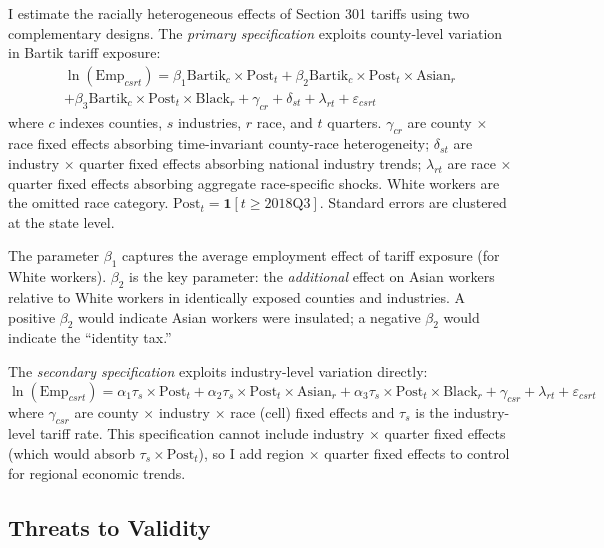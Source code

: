 \documentclass[12pt]{article}
\begin{document}
I estimate the racially heterogeneous effects of Section 301 tariffs using two complementary designs. The \textit{primary specification} exploits county-level variation in Bartik tariff exposure:
\begin{multline}\label{eq:main}
\ln(\text{Emp}_{csrt}) = \beta_1 \text{Bartik}_c \times \text{Post}_t + \beta_2 \text{Bartik}_c \times \text{Post}_t \times \text{Asian}_r \\
+ \beta_3 \text{Bartik}_c \times \text{Post}_t \times \text{Black}_r + \gamma_{cr} + \delta_{st} + \lambda_{rt} + \varepsilon_{csrt}
\end{multline}
where $c$ indexes counties, $s$ industries, $r$ race, and $t$ quarters. $\gamma_{cr}$ are county $\times$ race fixed effects absorbing time-invariant county-race heterogeneity; $\delta_{st}$ are industry $\times$ quarter fixed effects absorbing national industry trends; $\lambda_{rt}$ are race $\times$ quarter fixed effects absorbing aggregate race-specific shocks. White workers are the omitted race category. $\text{Post}_t = \mathbf{1}[t \geq 2018\text{Q3}]$. Standard errors are clustered at the state level.

The parameter $\beta_1$ captures the average employment effect of tariff exposure (for White workers). $\beta_2$ is the key parameter: the \textit{additional} effect on Asian workers relative to White workers in identically exposed counties and industries. A positive $\beta_2$ would indicate Asian workers were insulated; a negative $\beta_2$ would indicate the ``identity tax.''

The \textit{secondary specification} exploits industry-level variation directly:
\begin{equation}\label{eq:industry}
\ln(\text{Emp}_{csrt}) = \alpha_1 \tau_s \times \text{Post}_t + \alpha_2 \tau_s \times \text{Post}_t \times \text{Asian}_r + \alpha_3 \tau_s \times \text{Post}_t \times \text{Black}_r + \gamma_{csr} + \lambda_{rt} + \varepsilon_{csrt}
\end{equation}
where $\gamma_{csr}$ are county $\times$ industry $\times$ race (cell) fixed effects and $\tau_s$ is the industry-level tariff rate. This specification cannot include industry $\times$ quarter fixed effects (which would absorb $\tau_s \times \text{Post}_t$), so I add region $\times$ quarter fixed effects to control for regional economic trends.

\subsection{Threats to Validity}
\end{document}
